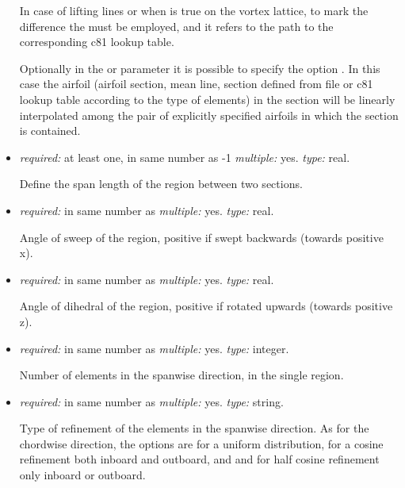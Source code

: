 \begin{itemize}
In case of lifting lines or when  is true on the vortex lattice, to mark the difference the  must be employed, and it refers to the path to the corresponding c81 lookup table. 

Optionally in the  or  parameter it is possible to specify the option . In this case the airfoil (airfoil section, mean line, section defined from file or c81 lookup table according to the type of elements) in the section will be linearly interpolated among the pair of explicitly specified airfoils in which the section is contained. 

\item {} \textit{required:} at least one, in same number as -1 \textit{multiple:} yes. \textit{type:} real.

Define the span length of the region between two sections.  

\item {} \textit{required:} in same number as  \textit{multiple:} yes. \textit{type:} real.

Angle of sweep of the region, positive if swept backwards (towards positive x).

\item {} \textit{required:} in same number as  \textit{multiple:} yes. \textit{type:} real.

Angle of dihedral of the region, positive if rotated upwards (towards positive z).

\item {} \textit{required:} in same number as  \textit{multiple:} yes. \textit{type:} integer.

Number of elements in the spanwise direction, in the single region.

\item {} \textit{required:} in same number as  \textit{multiple:} yes. \textit{type:} string.

Type of refinement of the elements in the spanwise direction. As for the chordwise direction, the options are  for a uniform distribution,  for a cosine refinement both inboard and outboard, and  and  for half cosine refinement only inboard or outboard. 
  
\end{itemize}

